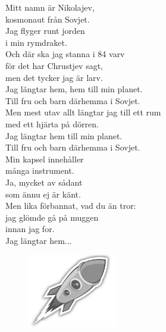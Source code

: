 \documentclass[a6paper,10pt]{article}
\begin{document}
\setlength{\oddsidemargin}{-0.47in}
\begin{center}
\end{center}
\begin{lyrics}
\small Mitt namn är Nikolajev,\\ 
kosmonaut från Sovjet.\\ 
Jag flyger runt jorden\\ 
i min rymdraket.\\ 
Och där ska jag stanna i 84 varv\\ 
för det har Chrustjev sagt,\\ 
men det tycker jag är larv.
\vspace{5pt}\\ 
Jag längtar hem, hem till min planet.\\ 
Till fru och barn därhemma i Sovjet.\\ 
Men mest utav allt längtar jag till ett rum\\ 
med ett hjärta på dörren.\\ 
Jag längtar hem till min planet.\\ 
Till fru och barn därhemma i Sovjet.
\vspace{5pt}\\ 
Min kapsel innehåller\\ 
många instrument.\\ 
Ja, mycket av sådant\\ 
som ännu ej är känt.\\ 
Men lika förbannat, vad du än tror:\\ 
jag glömde gå på muggen\\ 
innan jag for.
\vspace{5pt}\\ 
Jag längtar hem...\\
\end{lyrics}

\begin{figure}[!h]
\hfill
\includegraphics[width=0.35\textwidth]{rymdraket.png}
\end{figure}
\end{document}
